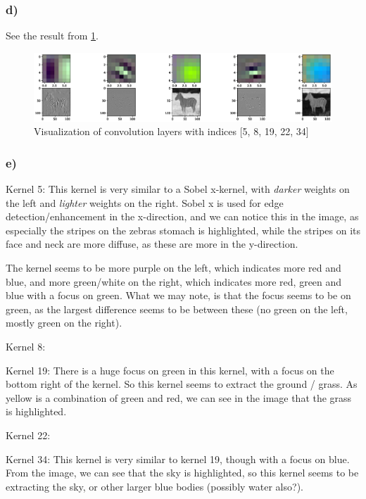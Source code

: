 
\subsubsection*{d)}
See the result from \cref{fig:task2d}. 

\begin{figure}[]
    \centering
    \includegraphics[width=1.00\textwidth]{figures/task2d_image.eps}
    \caption{Visualization of convolution layers with indices [5, 8, 19, 22, 34]}
    \label{fig:task2d}
\end{figure}

\subsubsection*{e)}
Kernel 5: 
This kernel is very similar to a Sobel x-kernel, with \textit{darker} weights on the left and \textit{lighter} weights on the right. Sobel x is used for edge detection/enhancement in the x-direction, and we can notice this in the image, as especially the stripes on the zebras stomach is highlighted, while the stripes on its face and neck are more diffuse, as these are more in the y-direction. 

The kernel seems to be more purple on the left, which indicates more red and blue, and more green/white on the right, which indicates more red, green and blue with a focus on green. What we may note, is that the focus seems to be on green, as the largest difference seems to be between these (no green on the left, mostly green on the right). 

Kernel 8: 


Kernel 19: 
There is a huge focus on green in this kernel, with a focus on the bottom right of the kernel. So this kernel seems to extract the ground / grass. As yellow is a combination of green and red, we can see in the image that the grass is highlighted. 

Kernel 22: 


Kernel 34: 
This kernel is very similar to kernel 19, though with a focus on blue. From the image, we can see that the sky is highlighted, so this kernel seems to be extracting the sky, or other larger blue bodies (possibly water also?). 
